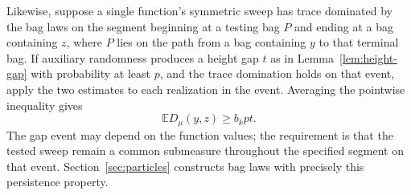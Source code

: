 Likewise, suppose a single function's symmetric sweep has trace dominated
by the bag laws on the segment beginning at a testing bag $P$ and ending
at a bag containing $z$, where $P$ lies on the path from a bag containing
$y$ to that terminal bag. If auxiliary randomness produces a height gap
$t$ as in Lemma~\ref{lem:height-gap} with probability at least $p$,
and the trace domination holds on that event, apply the two estimates to
each realization in the event. Averaging the pointwise inequality gives
\begin{equation}\label{eq:averaged-height-test}
 \mathbb E D_\mu(y,z)\geq b_kpt.
\end{equation}
The gap event may depend on the function values; the requirement
is that the tested sweep remain a common submeasure throughout the
specified segment on that event. Section~\ref{sec:particles} constructs
bag laws with precisely this persistence property.
